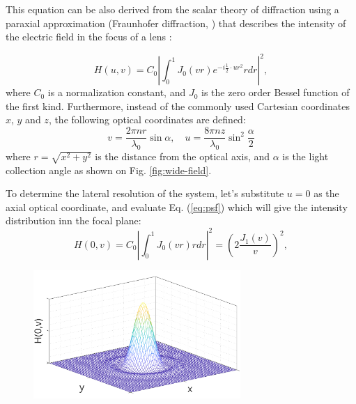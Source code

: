     This equation can be also derived from the scalar theory of diffraction using a paraxial approximation (Fraunhofer diffraction, \cite{born_principles_2013}) that describes the intensity of the electric field in the focus of a lens \cite{sheppard_imaging_1987}:

    \begin{equation}
      H(u,v) = C_0 \left| \int_0^1 J_0 (vr)e^{-i\frac{1}{2}\cdot ur^2} rdr \right|^2,
      \label{eq:psf}
    \end{equation}
    where $C_0$ is a normalization constant, and $J_0$ is the zero order Bessel function of the first kind. Furthermore, instead of the commonly used Cartesian coordinates $x$, $y$ and $z$, the following optical coordinates are defined:
    \begin{equation}
      v = \frac{2\pi n  r}{\lambda_0} \sin \alpha, \quad
      u=\frac{8\pi n  z}{\lambda_0} \sin^2 \frac{\alpha}{2}
      \label{eq:substitutions}
    \end{equation}
    where $r = \sqrt{x^2 + y^2}$ is the distance from the optical axis, and $\alpha$ is the light collection angle as shown on Fig. \ref{fig:wide-field}. 

    To determine the lateral resolution of the system, let's substitute $u=0$ as the axial optical coordinate, and evaluate Eq. (\ref{eq:psf}) which will give the intensity distribution inn the focal plane:
    \begin{equation}
      H(0,v) = C_0 \left| \int_0^1 J_0(vr)rdr \right|^2 = \left(2\frac{J_1(v)}{v} \right) ^2,
      \label{eq:airy}
    \end{equation}
    \begin{figure}
      \centering
      \includegraphics[width=0.7\textwidth]{airy}
      \label{fig:airy}
    \end{figure}


